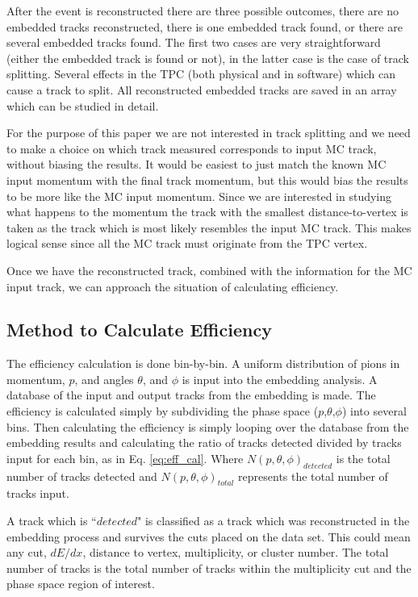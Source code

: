 \documentclass[12pt, letterpaper, twoside]{article}
\begin{document}
  After the event is reconstructed there are three possible outcomes, there are no embedded tracks reconstructed, there is one embedded track found, or there are several embedded tracks found. The first two cases are very straightforward (either the embedded track is found or not), in the latter case is the case of track splitting. Several effects in the TPC (both physical and in software) which can cause a track to split. All reconstructed embedded tracks are saved in an array which can be studied in detail.
 
 For the purpose of this paper we are not interested in track splitting and we need to make a choice on which track measured corresponds to input MC track, without biasing the results. It would be easiest to just match the known MC input momentum with the final track momentum, but this would bias the results to be more like the MC input momentum. Since we are interested in studying what happens to the momentum the track with the smallest distance-to-vertex is taken as the track which is most likely resembles the input MC track. This makes logical sense since all the MC track must originate from the TPC vertex. 
 
 Once we have the reconstructed track, combined with the information for the MC input track, we can approach the situation of calculating efficiency. 
 
 \subsection{Method to Calculate Efficiency}
 The efficiency calculation is done bin-by-bin. A uniform distribution of pions in momentum, $p$, and angles $\theta$, and $\phi$ is input into the embedding analysis. A database of the input and output tracks from the embedding is made. The efficiency is calculated simply by subdividing the phase space ($p$,$\theta$,$\phi$) into several bins. 
 Then calculating the efficiency is simply looping over the database from the embedding results and calculating the ratio of tracks detected divided by tracks input for each bin, as in Eq. \ref{eq:eff_cal}. Where $N(p,\theta,\phi)_{detected}$ is the total number of tracks detected and $N(p,\theta,\phi)_{total}$ represents the total number of tracks input. 
 
 A track which is ``$detected$" is classified as a track which was reconstructed in the embedding process and survives the cuts placed on the data set. This could mean any cut, $dE/dx$, distance to vertex, multiplicity, or cluster number. The total number of tracks is the total number of tracks within the multiplicity cut and the phase space region of interest.
   
\end{document}
